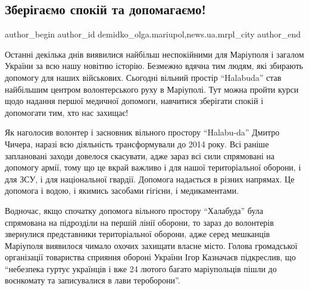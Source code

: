  
 
 
 
 
 
\subsection{Зберігаємо спокій та допомагаємо!}
\label{sec:26_02_2022.stz.news.ua.mrpl_city.1.zberigajemo_spokij_ta_dopomagajemo}
 
\ifcmt
 author_begin
   author_id demidko_olga.mariupol,news.ua.mrpl_city
 author_end
\fi

Останні декілька днів виявилися найбільш неспокійними для Маріуполя і загалом
України за всю нашу новітню історію. Безмежно вдячна тим людям, які збирають
допомогу для наших військових. Сьогодні вільний простір \enquote{Halabuda} став
найбільшим центром волонтерського руху в Маріуполі. Тут можна пройти курси щодо
надання першої медичної допомоги, навчитися зберігати спокій і допомогати тим,
хто нас захищає!

Як наголосив волонтер і засновник вільного простору \enquote{Halabu\hyp{}da} Дмитро Чичера,
наразі всю діяльність трансформували до 2014 року. Всі раніше заплановані
заходи довелося скасувати, адже зараз всі сили спрямовані на допомогу армії,
тому що це вкрай важливо і для нашої територіальної оборони, і для ЗСУ, і для
національної гвардії. Допомога надається в різних напрямах. Це допомога і
водою, і якимись засобами гігієни, і медикаментами.


Водночас, якщо спочатку допомога вільного простору \enquote{Халабуда} була спрямована
на підрозділи на першій лінії оборони, то зараз до волонтерів звернулися
представники територіальної оборони, адже серед мешканців Маріуполя виявилося
чимало охочих захищати власне місто. Голова громадської організації товариства
сприяння обороні України Ігор Казначаєв підкреслив, що \enquote{небезпека гуртує
українців і вже 24 лютого багато маріупольців пішли до воєнкомату та
записувалися в лави тероборони}.

